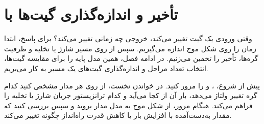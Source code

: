 \chapter{تأخیر و اندازه‌گذاری گیت‌ها با }
\label{chap:delay}

وقتی ورودی یک گیت تغییر می‌کند، خروجی چه زمانی تغییر می‌کند؟ برای
پاسخ، ابتدا زمان را روی شکل موج اندازه می‌گیریم. سپس از روی مسیر
شارژ یا تخلیه و ظرفیت گره‌ها، تأخیر را تخمین می‌زنیم. در ادامه فصل،
همین مدل پایه را برای مقایسه گیت‌ها، انتخاب تعداد مراحل و اندازه‌گذاری
گیت‌های یک مسیر به کار می‌بریم.

پیش از شروع، ، 
و  را مرور کنید.
در خواندن نخست، از روی هر مدار مشخص کنید کدام گره تغییر ولتاژ می‌دهد،
بار آن از کجا می‌آید و کدام ترانزیستور جریان شارژ یا تخلیه را فراهم می‌کند.
هنگام مرور، از شکل موج به مدل مدار بروید و سپس بررسی کنید که مقدار
به‌دست‌آمده با افزایش بار یا کاهش قدرت راه‌انداز چگونه تغییر می‌کند.







